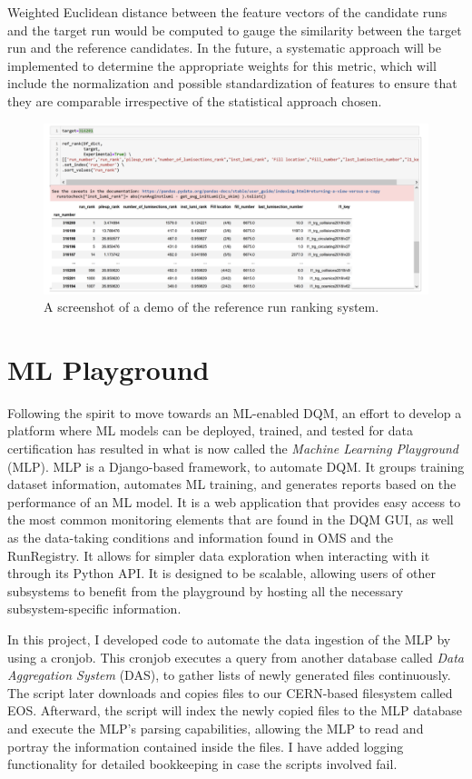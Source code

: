 Weighted Euclidean distance between the feature vectors of the candidate runs and the target run would be computed to gauge the similarity between the target run and the reference candidates. In the future, a systematic approach will be implemented to determine the appropriate weights for this metric, which will include the normalization and possible standardization of features to ensure that they are comparable irrespective of the statistical approach chosen.


\begin{figure}
	\centering
	\includegraphics[width=\linewidth]{Images/ranking.png}
	\caption{A screenshot of a demo of the reference run ranking system.}
	\label{fig:ranking}
\end{figure}


\section{ML Playground}\label{sect:MLP}
Following the spirit to move towards an ML-enabled DQM, an effort to develop a platform where ML models can be deployed, trained, and tested for data certification has resulted in what is now called the \textit{Machine Learning Playground} (MLP). MLP is a Django-based framework, to automate DQM\cite{Wachirapusitan_2023}. It groups training dataset information, automates ML training, and generates reports based on the performance of an ML model. It is a web application that provides easy access to the most common monitoring elements that are found in the DQM GUI, as well as the data-taking conditions and information found in OMS and the RunRegistry. It allows for simpler data exploration when interacting with it through its Python API. It is designed to be scalable, allowing users of other subsystems to benefit from the playground by hosting all the necessary subsystem-specific information.

In this project, I developed code to automate the data ingestion of the MLP by using a cronjob. This cronjob executes a query from another database called \textit{Data Aggregation System} (DAS), to gather lists of newly generated files continuously. The script later downloads and copies files to our CERN-based filesystem called EOS. Afterward, the script will index the newly copied files to the MLP database and execute the MLP's parsing capabilities, allowing the MLP to read and portray the information contained inside the files.
I have added logging functionality for detailed bookkeeping in case the scripts involved fail.

